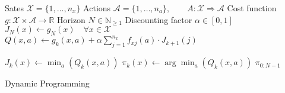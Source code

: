 \documentclass{article}
\begin{document}
\begin{preview}
    \begin{algorithm}[H]
        \begin{algorithmic}
        \Require
        \Statex Sates $\mathcal{X} = \{1, \dots, n_x\}$
        \Statex Actions $\mathcal{A} = \{1, \dots, n_a\},\qquad A: \mathcal{X} \Rightarrow \mathcal{A}$
        \Statex Cost function $g: \mathcal{X} \times \mathcal{A} \rightarrow \mathbb{R}$
        \Statex Horizon $N \in \mathbb{N}_{\geq 1}$
        \Statex Discounting factor $\alpha \in [0, 1]$
            \State $J_N(x) \gets g_N(x) \quad \forall x \in \mathcal{X}$
                        \State $Q(x, a) \gets g_k(x, a) + \alpha \sum_{j=1}^{n_x} f_{xj}(a) \cdot J_{k+1}(j)$
                    \EndFor

                    \State $J_k (x) \gets \min_a (Q_k(x,a))$
                    \State $\pi_k(x) \gets \arg \min_a (Q_k(x, a))$
                \EndFor
            \EndFor
            \Return $\pi_{0:N-1}$
        \EndProcedure
        \end{algorithmic}
    \caption{Dynamic Programming}
    \label{alg:dynamic-programming: Learn a strategy}
    \end{algorithm}
\end{preview}
\end{document}
